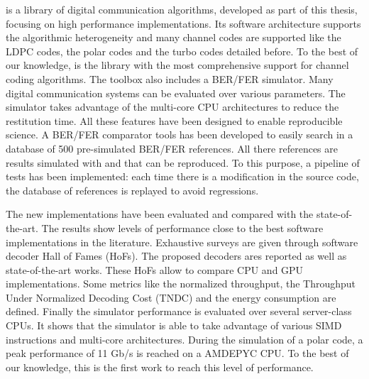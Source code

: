 \AFFECT is a library of digital communication algorithms, developed as part of
this thesis, focusing on high performance implementations. Its software
architecture supports the algorithmic heterogeneity and many channel codes are
supported like the LDPC codes, the polar codes and the turbo codes detailed
before. To the best of our knowledge, \AFFECT is the library with the most
comprehensive support for channel coding algorithms. The toolbox also includes a
BER/FER simulator. Many digital communication systems can be evaluated over
various parameters. The simulator takes advantage of the multi-core CPU
architectures to reduce the restitution time. All these features have been
designed to enable reproducible science. A BER/FER comparator tools has been
developed to easily search in a database of 500 pre-simulated BER/FER
references. All there references are results simulated with \AFFECT and that can
be reproduced. To this purpose, a pipeline of tests has been implemented: each
time there is a modification in the source code, the database of references is
replayed to avoid regressions.

The new implementations have been evaluated and compared with the
state-of-the-art. The results show levels of performance close to the best
software implementations in the literature. Exhaustive surveys are given through
software decoder Hall of Fames (HoFs). The proposed decoders ares reported as
well as state-of-the-art works. These HoFs allow to compare CPU and GPU
implementations. Some metrics like the normalized throughput, the Throughput
Under Normalized Decoding Cost (TNDC) and the energy consumption are defined.
Finally the \AFFECT simulator performance is evaluated over several server-class
CPUs. It shows that the simulator is able to take advantage of various SIMD
instructions and multi-core architectures. During the simulation of a polar
code, a peak performance of 11 Gb/s is reached on a AMD\R EPYC CPU. To the best
of our knowledge, this is the first work to reach this level of performance.


